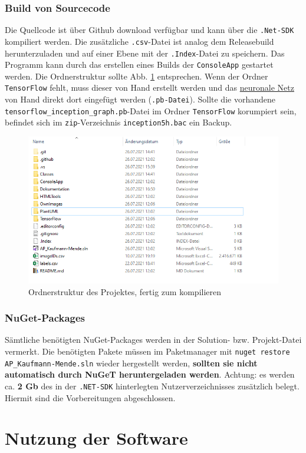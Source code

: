 \documentclass[doktyp=parbeit]{TUBAFarbeiten}
\begin{document}
\subsubsection{Build von Sourcecode}
Die Quellcode ist über Github download verfügbar und kann über die \texttt{.Net-SDK} kompiliert werden. Die zusätzliche \texttt{.csv}-Datei ist analog dem Releasebuild herunterzuladen und auf einer Ebene mit der \texttt{.Index}-Datei zu speichern. Das Programm kann durch das erstellen eines Builds der \texttt{ConsoleApp} gestartet werden. Die Ordnerstruktur sollte Abb. \ref{fig:github} entsprechen. Wenn der Ordner \texttt{TensorFlow} fehlt, muss dieser von Hand erstellt werden und das \href{https://storage.googleapis.com/download.tensorflow.org/models/inception5h.zip}{neuronale Netz} von Hand direkt dort eingefügt werden (\texttt{.pb-Datei}). Sollte die vorhandene \texttt{tensorflow\_inception\_graph.pb}-Datei im Ordner \texttt{TensorFlow} korumpiert sein, befindet sich im \texttt{zip}-Verzeichnis \texttt{inception5h.bac} ein Backup.
\begin{figure}
	\centering
	\includegraphics[width=0.7\linewidth]{Bilder/github}
	\caption{Ordnerstruktur des Projektes, fertig zum kompilieren}
	\label{fig:github}
\end{figure}
\subsubsection*{NuGet-Packages}
Sämtliche benötigten NuGet-Packages werden in der Solution- bzw. Projekt-Datei vermerkt. Die benötigten Pakete müssen im Paketmanager mit \texttt{nuget restore AP\_Kaufmann-Mende.sln} wieder hergestellt werden, \textbf{sollten sie nicht automatisch durch NuGeT heruntergeladen werden}. Achtung: es werden ca. \textbf{2 Gb} des in der \texttt{.NET-SDK} hinterlegten Nutzerverzeichnisses zusätzlich belegt. Hiermit sind die Vorbereitungen abgeschlossen.	
\section{Nutzung der Software}
\end{document}

